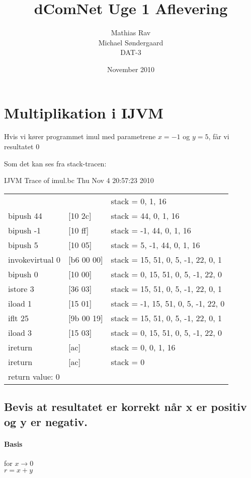 \documentclass[12pt,a4paper]{article}
\begin{document}
\title{dComNet Uge 1 Aflevering}
\author{Mathias Rav \\
		Michael Søndergaard \\
		DAT-3}
\date{November 2010}
\maketitle

\section{Multiplikation i IJVM}
Hvis vi kører programmet imul med parametrene $x=-1$ og $y=5$, får vi resultatet $0$

Som det kan ses fra stack-tracen:

IJVM Trace of imul.bc Thu Nov  4 20:57:23 2010

\begin{tabular}{lll}
                  &           & stack = 0, 1, 16 \\
bipush 44         & [10 2c]   & stack = 44, 0, 1, 16 \\
bipush -1         & [10 ff]   & stack = -1, 44, 0, 1, 16 \\
bipush 5          & [10 05]   & stack = 5, -1, 44, 0, 1, 16 \\
invokevirtual 0   & [b6 00 00]& stack = 15, 51, 0, 5, -1, 22, 0, 1 \\
bipush 0          & [10 00]   & stack = 0, 15, 51, 0, 5, -1, 22, 0 \\
istore 3          & [36 03]   & stack = 15, 51, 0, 5, -1, 22, 0, 1 \\
iload 1           & [15 01]   & stack = -1, 15, 51, 0, 5, -1, 22, 0 \\
iflt 25           & [9b 00 19]& stack = 15, 51, 0, 5, -1, 22, 0, 1 \\
iload 3           & [15 03]   & stack = 0, 15, 51, 0, 5, -1, 22, 0 \\
ireturn           & [ac]      & stack = 0, 0, 1, 16 \\
ireturn           & [ac]      & stack = 0 \\
return value: 0
\end{tabular}

\subsection{Bevis at resultatet er korrekt når x er positiv og y er negativ.}
\paragraph{Basis}
for $x \rightarrow 0$ \\
	$r = x + y$
\end{document}
